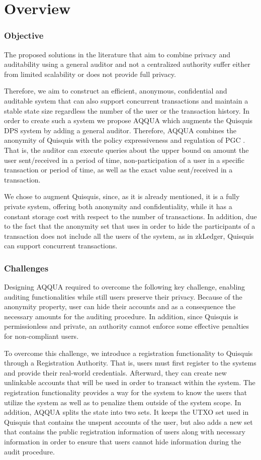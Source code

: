 \section{Overview}

\subsubsection{Objective}
The proposed solutions in the literature that aim to combine privacy and auditability using a general auditor and not a centralized authority suffer either from limited scalability or does not provide full privacy.

Therefore, we aim to construct an efficient, anonymous, confidential and auditable system that can also support concurrent transactions and maintain a stable state size regardless the number of the user or the transaction history. In order to create such a system we propose AQQUA which augments the Quisquis \cite{fauzi2019quisquis} DPS system by adding a general auditor. Therefore, AQQUA combines the anonymity of Quisquis with the policy expressiveness and regulation of PGC \cite{PGC}. That is, the auditor can execute queries about the upper bound on amount the user sent/received in a period of time, non-participation of a user in a specific transaction or period of time, as well as the exact value sent/received in a transaction.

We chose to augment Quisquis, since, as it is already mentioned, it is a fully private system, offering both anonymity and confidentiality, while it has a constant storage cost with respect to the number of transactions. In addition, due to the fact that the anonymity set that uses in order to hide the participants of a transaction does not include all the users of the system, as in zkLedger, Quisquis can support concurrent transactions. 

\subsubsection{Challenges}
Designing AQQUA required to overcome the following key challenge, enabling auditing functionalities while still users preserve their privacy. Because of the anonymity property, user can hide their accounts and as a consequence the necessary amounts for the auditing procedure. In addition, since Quisquis is permissionless and private, an authority cannot enforce some effective penalties for non-compliant users. 

To overcome this challenge, we introduce a registration functionality to Quisquis through a Registration Authority. That is, users must first register to the systems and provide their real-world credentials. Afterward, they can create new unlinkable accounts that will be used in order to transact within the system. The registration functionality provides a way for the system to know the users that utilize the system as well as to penalize them outside of the system scope. In addition, AQQUA splits the state into two sets. It keeps the UTXO set used in Quisquis that contains the unspent accounts of the user, but also adds a new set that contains the public registration information of users along with necessary information in order to ensure that users cannot hide information during the audit procedure.
